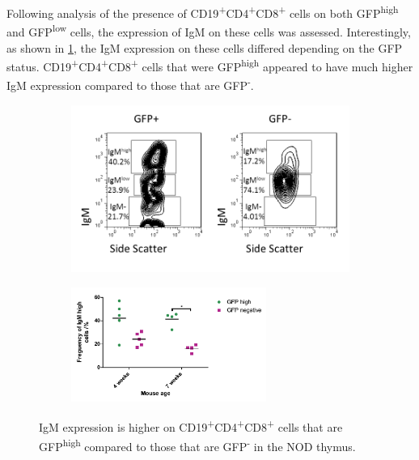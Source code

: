 
Following analysis of the presence of CD19\textsuperscript{+}CD4\textsuperscript{+}CD8\textsuperscript{+} cells on both GFP\textsuperscript{high} and GFP\textsuperscript{low} cells, the expression of IgM on these cells was assessed.
Interestingly, as shown in \cref{subfig:IgMallpos}, the IgM expression on these cells differed depending on the GFP status.
CD19\textsuperscript{+}CD4\textsuperscript{+}CD8\textsuperscript{+} cells that were GFP\textsuperscript{high} appeared to have much higher IgM expression compared to those that are GFP\textsuperscript{-}.

\begin{figure}
	\begin{subfigure}{\textwidth}
	\includegraphics[width=\textwidth]{Figures/IgMallpos.png}
	\caption{}
	\label{subfig:IgMallpos}
	\end{subfigure}
	\begin{subfigure}{\textwidth}
	\centering
	\includegraphics[width=0.7\textwidth]{Figures/IgMhighGFP.pdf}
	\caption{}
	\label{subfig:IgMallposgraph}
	\end{subfigure}
\caption[IgM expression is higher on CD19\textsuperscript{+}CD4\textsuperscript{+}CD8\textsuperscript{+} cells that are GFP\textsuperscript{high} compared to those that are GFP\textsuperscript{-} in the NOD thymus]{IgM expression is higher on CD19\textsuperscript{+}CD4\textsuperscript{+}CD8\textsuperscript{+} cells that are GFP\textsuperscript{high} compared to those that are GFP\textsuperscript{-} in the NOD thymus.
}
\end{figure}
